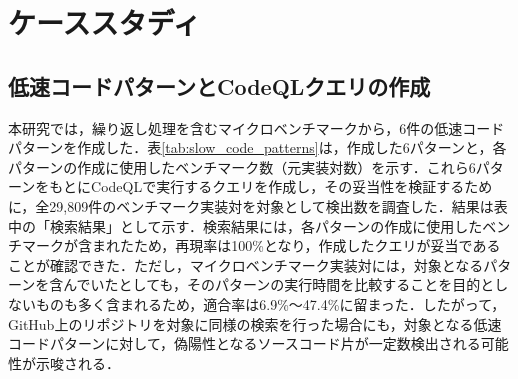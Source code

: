 \documentclass[submit,techrep,noauthor]{ipsj}
\begin{document}
\section{ケーススタディ}
\label{sec:case-study}

\subsection{低速コードパターンとCodeQLクエリの作成}
\label{subsection:pattern}

本研究では，繰り返し処理を含むマイクロベンチマークから，6件の低速コードパターンを作成した．表\ref{tab:slow_code_patterns}は，作成した6パターンと，各パターンの作成に使用したベンチマーク数（元実装対数）を示す．これら6パターンをもとにCodeQLで実行するクエリを作成し，その妥当性を検証するために，全29,809件のベンチマーク実装対を対象として検出数を調査した．結果は表中の「検索結果」として示す．検索結果には，各パターンの作成に使用したベンチマークが含まれたため，再現率は100\%となり，作成したクエリが妥当であることが確認できた．ただし，マイクロベンチマーク実装対には，対象となるパターンを含んでいたとしても，そのパターンの実行時間を比較することを目的としないものも多く含まれるため，適合率は6.9\%～47.4\%に留まった．したがって，GitHub上のリポジトリを対象に同様の検索を行った場合にも，対象となる低速コードパターンに対して，偽陽性となるソースコード片が一定数検出される可能性が示唆される．
\end{document}
